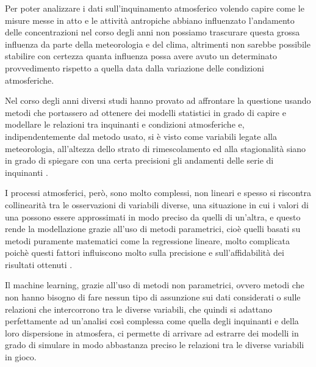 \documentclass[a4paper,12pt]{report}
\begin{document}
Per poter analizzare i dati sull'inquinamento atmosferico volendo capire come le misure messe in atto e le attività antropiche abbiano influenzato l'andamento delle concentrazioni nel corso degli anni non possiamo trascurare questa grossa influenza da parte della meteorologia e del clima, altrimenti non sarebbe possibile stabilire con certezza quanta influenza possa avere avuto un determinato provvedimento rispetto a quella data dalla variazione delle condizioni atmosferiche.  

Nel corso degli anni diversi studi hanno provato ad affrontare la questione usando metodi che portassero ad ottenere dei modelli statistici in grado di capire e modellare le relazioni tra inquinanti e condizioni atmosferiche e, indipendentemente dal metodo usato, si è visto come variabili legate alla meteorologia, all'altezza dello strato di rimescolamento ed alla stagionalità siano in grado di spiegare con una certa precisioni gli andamenti delle serie di inquinanti \cite{aldrin2005generalised, elminir2005depndence, eagleman1991air, seagal1982numerical, cattani2014analisi, barmpadimos2011influence}.  %

I processi atmosferici, però, sono molto complessi, non lineari e spesso si riscontra collinearità tra le osservazioni di variabili diverse, una situazione in cui i valori di una possono essere approssimati in modo preciso da quelli di un'altra, e questo rende la modellazione grazie all'uso di metodi parametrici, cioè quelli basati su metodi puramente matematici come la regressione lineare, molto complicata poichè questi fattori influiscono molto sulla precisione e sull'affidabilità dei risultati ottenuti \cite{gunst1975regression}. 

Il machine learning, grazie all'uso di metodi non parametrici, ovvero metodi che non hanno bisogno di fare nessun tipo di assunzione sui dati considerati o sulle relazioni che intercorrono tra le diverse variabili, che quindi si adattano perfettamente ad un'analisi così complessa come quella degli inquinanti e della loro dispersione in atmosfera, ci permette di arrivare ad estrarre dei modelli in grado di simulare in modo abbastanza preciso le relazioni tra le diverse variabili in gioco.  
\end{document}
